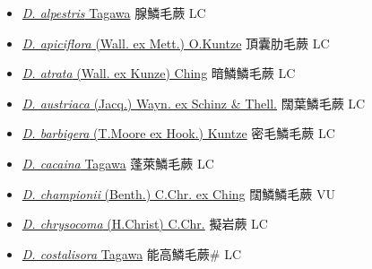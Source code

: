 \begin{itemize}
  \begin{itemize}
        \item[] \href{http://www.theplantlist.org/tpl1.1/search?q=Dryopteris+alpestris}{\textit{D. alpestris} Tagawa}   腺鱗毛蕨 LC
        \item[] \href{http://www.theplantlist.org/tpl1.1/search?q=Dryopteris+apiciflora}{\textit{D. apiciflora} (Wall. ex Mett.) O.Kuntze}     頂囊肋毛蕨 LC
        \item[] \href{http://www.theplantlist.org/tpl1.1/search?q=Dryopteris+atrata}{\textit{D. atrata} (Wall. ex Kunze) Ching}   暗鱗鱗毛蕨 LC
        \item[] \href{http://www.theplantlist.org/tpl1.1/search?q=Dryopteris+austriaca}{\textit{D. austriaca} (Jacq.) Wayn. ex Schinz \& Thell.}   闊葉鱗毛蕨 LC
        \item[] \href{http://www.theplantlist.org/tpl1.1/search?q=Dryopteris+barbigera}{\textit{D. barbigera} (T.Moore ex Hook.) Kuntze}   密毛鱗毛蕨 LC
        \item[] \href{http://www.theplantlist.org/tpl1.1/search?q=Dryopteris+cacaina}{\textit{D. cacaina} Tagawa}   蓬萊鱗毛蕨 LC
        \item[] \href{http://www.theplantlist.org/tpl1.1/search?q=Dryopteris+championii}{\textit{D. championii} (Benth.) C.Chr. ex Ching}   闊鱗鱗毛蕨 VU
        \item[] \href{http://www.theplantlist.org/tpl1.1/search?q=Dryopteris+chrysocoma}{\textit{D. chrysocoma} (H.Christ) C.Chr.}   擬岩蕨 LC
        \item[] \href{http://www.theplantlist.org/tpl1.1/search?q=Dryopteris+costalisora}{\textit{D. costalisora} Tagawa}   能高鱗毛蕨\# LC

\end{itemize}
\end{itemize}
